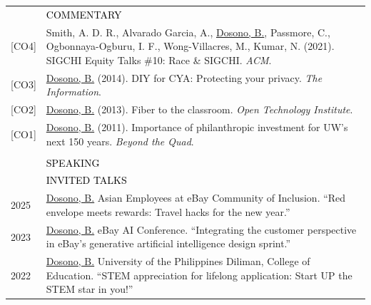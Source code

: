 \documentclass[12pt]{article}
\begin{document}
{\begin{longtable}{R{0.75in}p{5.0in}}
& \large \textcolor{black}{\uppercase{Commentary}}\\
\footnotesize{[CO4]} & Smith, A. D. R., Alvarado Garcia, A., \href{https://web.archive.org/web/20230924193719/https://sigchi.org/sigchi-equity-talks-10-race-sigchi/}{Dosono, B.}, Passmore, C., Ogbonnaya-Ogburu, I. F., Wong-Villacres, M., Kumar, N. (2021). SIGCHI Equity Talks \#10: Race \& SIGCHI. \textit{ACM}.\\

\footnotesize{[CO3]} & \href{https://web.archive.org/web/20151020091932/https://theinformation.ischool.uw.edu/wp/2014/04/diy-for-cya-protecting-your-privacy/}{Dosono, B.} (2014). DIY for CYA: Protecting your privacy. \textit{The Information}.\\

\footnotesize{[CO2]} & \href{https://www.newamerica.org/insights/fiber-to-the-classroom/}{Dosono, B.} (2013). Fiber to the classroom. \textit{Open Technology Institute}.\\

\footnotesize{[CO1]} & \href{https://uwartsci.wordpress.com/2011/11/25/importance-of-philanthropic-investment-for-the-next-150/}{Dosono, B.} (2011). 
Importance of philanthropic investment for UW's next 150 years. \textit{Beyond the Quad}.\\\\

\sout{\hfill} 
& \par \Large \textcolor{black}{\uppercase{Speaking\hspace{6pt} \sout{\hfill}}} \medskip \\

& \large \textcolor{black}{\uppercase{Invited Talks}}\\

\footnotesize{2025} & \href{https://www.ebayinc.com/company/be-for-everyone/}{Dosono, B.} Asian Employees at eBay Community of Inclusion. ``Red envelope meets rewards: Travel hacks for the new year.''\\

\footnotesize{2023} & \href{https://www.ebayinc.com/}{Dosono, B.} eBay AI Conference. ``Integrating the customer perspective in eBay's generative artificial intelligence design sprint.''\\

\footnotesize{2022} & \href{https://www.facebook.com/100080345041724/videos/399277394963426}{Dosono, B.} University of the Philippines Diliman, College of Education. ``STEM appreciation for lifelong application: Start UP the STEM star in you!''\\


\end{longtable}}
\end{document}
